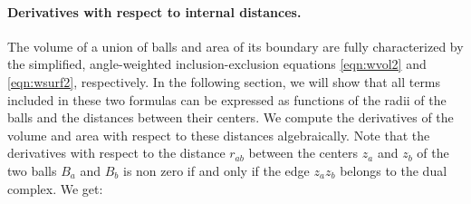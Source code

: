 \documentclass[11 pt]{article}
\theoremstyle{plain} \theorembodyfont{\rmfamily}
\begin{document}
\paragraph{Derivatives with respect to internal distances.}

The volume of a union of balls and area of its boundary are fully characterized by the simplified, angle-weighted inclusion-exclusion equations \ref{eqn:wvol2} and \ref{eqn:wsurf2}, respectively.  In the following section, we will show that all terms included in these two formulas can be expressed as functions of the radii of the balls and the distances between their centers.  We compute the derivatives of the volume and area with respect to these distances algebraically. Note that the derivatives with respect to the distance $r_{ab}$
between the centers $z_a$ and $z_b$ of the two balls $B_a$ and $B_b$ is non zero if and only if the
edge $z_a z_b$ belongs to the dual complex. We get:
\end{document}
